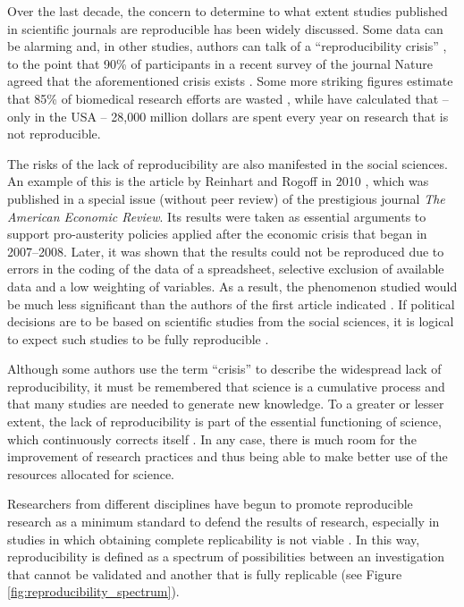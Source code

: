 \documentclass[ijgi,article,submit,moreauthors,pdftex]{Definitions/mdpi}
\begin{document}
Over the last decade, the concern to determine to what extent studies published in scientific journals are reproducible has been widely discussed. Some data can be alarming and, in other studies, authors can talk of a ``reproducibility crisis'' \cite{Begley2015a, Baker2016}, to the point that 90\% of participants in a recent survey of the journal Nature agreed that the aforementioned crisis exists \cite{Baker2016}. Some more striking figures estimate that 85\% of biomedical research efforts are wasted \cite{Begley2015a}, while \cite{Freedman2015a} have calculated that -- only in the USA -- 28,000 million dollars are spent every year on research that is not reproducible.

The risks of the lack of reproducibility are also manifested in the social sciences. An example of this is the article by Reinhart and Rogoff in 2010 \citep{Reinhart2010a}, which was published in a special issue (without peer review) of the prestigious journal \textit{The American Economic Review}. Its results were taken as essential arguments to support pro-austerity policies applied after the economic crisis that began in 2007--2008. Later, it was shown that the results could not be reproduced due to errors in the coding of the data of a spreadsheet, selective exclusion of available data and a low weighting of variables. As a result, the phenomenon studied would be much less significant than the authors of the first article indicated \citep{Herndon2014a,Reinhart2010a}. If political decisions are to be based on scientific studies from the social sciences, it is logical to expect such studies to be fully reproducible \cite{Brunsdon2014a}.

Although some authors use the term ``crisis'' to describe the widespread lack of reproducibility, it must be remembered that science is a cumulative process and that many studies are needed to generate new knowledge. To a greater or lesser extent, the lack of reproducibility is part of the essential functioning of science, which continuously corrects itself \cite{OpenScienceCollaboration2015a}. In any case, there is much room for the improvement of research practices and thus being able to make better use of the resources allocated for science.

Researchers from different disciplines have begun to promote reproducible research as a minimum standard to defend the results of research, especially in studies in which obtaining complete replicability is not viable \cite{Peng2011a}. In this way, reproducibility is defined as a spectrum of possibilities between an investigation that cannot be validated and another that is fully replicable (see Figure \ref{fig:reproducibility_spectrum}).
\end{document}
